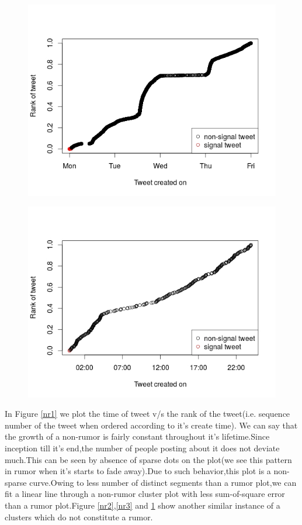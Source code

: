 \begin{figure}[H]
\begin{minipage}{.45\linewidth}
		\includegraphics[width=\linewidth]{images/nrumor3.jpeg}
		\label{nr3}
	\end{minipage}
	\hspace{.05\linewidth}
	\begin{minipage}{.45\linewidth}
		\includegraphics[width=\linewidth]{images/nrumor4.jpeg}
		\label{nr4}
	\end{minipage}
\end{figure}

  In Figure \ref{nr1} we plot the time of tweet v/s the rank of the tweet(i.e. sequence number of the tweet when ordered according to it's create time).
  We can say that the growth of a non-rumor is fairly constant throughout it's lifetime.Since inception till it's end,the number of people posting about it does not deviate much.This can be seen by absence of sparse dots on the plot(we see this pattern in rumor when it's starts to fade away).Due to such behavior,this plot is a non-sparse curve.Owing to less number of distinct segments than a rumor plot,we can fit a linear line through a non-rumor cluster plot with less sum-of-square error than a rumor plot.Figure \ref{nr2},\ref{nr3} and \ref{nr4} show another similar instance of a clusters which do not constitute a rumor. 

